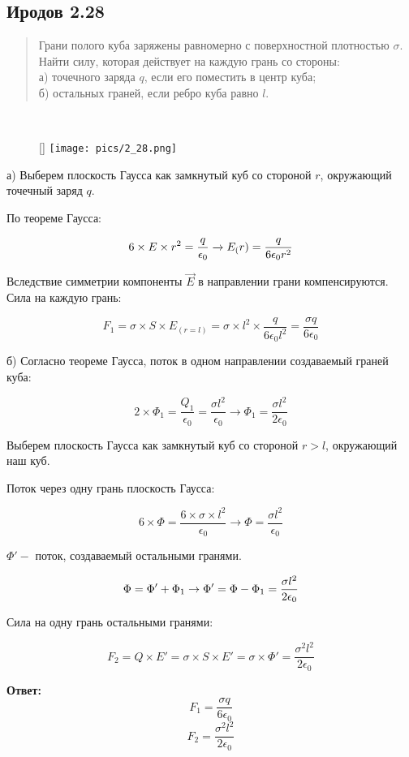 \subsection*{Иродов 2.28}

\setcounter{equation}{0}

\begin{abstract}
Грани полого куба заряжены равномерно с поверхностной плотностью $\sigma$. Найти силу, которая действует на каждую
грань со стороны:\\
а) точечного заряда $q$, если его поместить в центр куба;\\
б) остальных граней, если ребро куба равно $l$.
\end{abstract}

\noindent \hrulefill
\\
\begin{wrapfigure}[6]{r}{0.30\textwidth}
	\raisebox{0pt}[\dimexpr{}\baselineskip\relax]{
	\texttt{[image: pics/2\_28.png]}}
\end{wrapfigure}

а) Выберем плоскость Гаусса как замкнутый куб со стороной $r$, окружающий точечный заряд $q$.

По теореме Гаусса:

$$6\times E \times r^2=\frac{q}{\epsilon_{0}}\\ \xrightarrow{} E_(r) = \frac{q}{6\epsilon_0  r^2}$$

Вследствие симметрии компоненты $\overrightarrow{E}$ в направлении грани компенсируются. \\Сила на каждую грань:

$$F_1 = \sigma \times S \times E_(r=l) = \sigma \times l^2 \times \frac{q}{6\epsilon_0  l^2} = \frac{\sigma q}{6 \epsilon_0}$$

б) Согласно теореме Гаусса, поток в одном направлении создаваемый граней куба:

$$2 \times \Phi_1 = \frac{Q_1}{\epsilon_0} = \frac{\sigma l^2}{\epsilon_0} \xrightarrow{} \Phi_1 = \frac{\sigma l^2}{2 \epsilon_0}$$

Выберем плоскость Гаусса как замкнутый куб со стороной $r>l$, окружающий наш куб.

Поток через одну грань плоскость Гаусса:

$$6 \times \Phi = \frac{6 \times \sigma \times l^2}{\epsilon_0} \rightarrow \Phi = \frac{\sigma l^2}{\epsilon_0}$$

$\Phi' - $ поток, создаваемый остальными гранями.

$$\Phi = \Phi' + \Phi_1 \\ \rightarrow \Phi' = \Phi - \Phi_1 = \frac{\sigma l^2}{2 \epsilon_0}$$

Сила на одну грань остальными гранями:

$$F_2 = Q \times E' = \sigma \times S \times E' = \sigma \times \Phi' = \frac{\sigma^2 l^2}{2 \epsilon_0}$$

\textbf{Ответ:}
$$F_1 = \frac{\sigma q}{6 \epsilon_0}$$ 
$$ F_2 = \frac{\sigma^2 l^2}{2 \epsilon_0}$$





